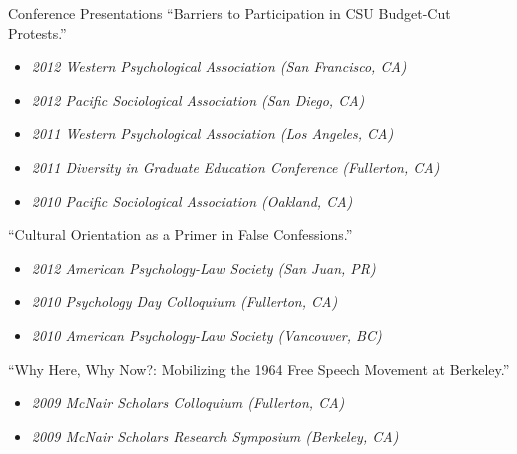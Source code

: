 \documentclass{resume} %
\begin{document}
\begin{rSection}{Conference Presentations}
``Barriers to Participation in CSU Budget-Cut Protests.''
\vspace*{-.75em} 
\begin{itemize}[leftmargin=.25in] 
\item {\footnotesize \it 2012 Western Psychological Association (San Francisco, CA)}\vspace*{-.75em} 
\item {\footnotesize \it 2012 Pacific Sociological Association (San Diego, CA)}\vspace*{-.75em} 
\item {\footnotesize \it 2011 Western Psychological Association (Los Angeles, CA)}\vspace*{-.75em} 
\item {\footnotesize \it 2011 Diversity in Graduate Education Conference (Fullerton, CA)}\vspace*{-.75em} 
\item {\footnotesize \it 2010 Pacific Sociological Association (Oakland, CA)}
\end{itemize} 

``Cultural Orientation as a Primer in False Confessions.''
\vspace*{-.75em} 
\begin{itemize}[leftmargin=.25in] 
\item {\footnotesize \it 2012 American Psychology-Law Society (San Juan, PR)}\vspace*{-.75em} 
\item {\footnotesize \it 2010 Psychology Day Colloquium (Fullerton, CA)}\vspace*{-.75em} 
\item {\footnotesize \it 2010 American Psychology-Law Society (Vancouver, BC)}
\end{itemize} 

``Why Here, Why Now?: Mobilizing the 1964 Free Speech Movement at
Berkeley.''
\vspace*{-.75em} 
\begin{itemize}[leftmargin=.25in] 
\item {\footnotesize \it 2009 McNair Scholars Colloquium (Fullerton, CA)}\vspace*{-.75em} 
\item {\footnotesize \it 2009 McNair Scholars Research Symposium (Berkeley, CA)}
\end{itemize}  

\end{rSection}
\end{document}

